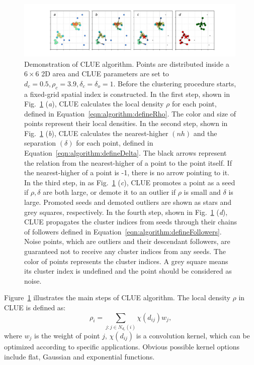 \begin{figure}[ht]
    \centering
    \includegraphics[trim=5cm 0cm 4cm 0cm, clip,width=0.99\textwidth]{chapters/HGCal/figures/clue/Figure2.pdf}
    \caption{Demonstration of CLUE algorithm. Points are distributed inside a $6\times6$ 2D area and CLUE parameters are set to $d_c=0.5,\rho_c=3.9,\delta_c=\delta_o=1$. Before the clustering procedure starts, a fixed-grid spatial index is constructed. In the first step, shown in Fig.~\ref{fig:algorithm:procedure} (\emph{a}), CLUE calculates the local density $\rho$ for each point, defined in Equation~\ref{eqn:algorithm:defineRho}. The color and size of points represent their local densities. In the second step, shown in Fig.~\ref{fig:algorithm:procedure} (\emph{b}), CLUE calculates the nearest-higher $(nh)$ and the separation $(\delta)$ for each point, defined in Equation~\ref{eqn:algorithm:defineDelta}. The black arrows represent the relation from the nearest-higher of a point to the point itself. If the nearest-higher of a point is -1, there is no arrow pointing to it. In the third step, in as Fig.~\ref{fig:algorithm:procedure} (\emph{c}), CLUE promotes a point as a seed if $\rho,\delta$ are both large, or demote it to an outlier if $\rho$ is small and $\delta$ is large. Promoted seeds and demoted outliers are shown as stars and grey squares, respectively. In the fourth step, shown in Fig.~\ref{fig:algorithm:procedure} (\emph{d}), CLUE propagates the cluster indices from seeds through their chains of followers defined in Equation~\ref{eqn:algorithm:defineFollowers}. Noise points, which are outliers and their descendant followers, are guaranteed not to receive any cluster indices from any seeds. The color of points represents the cluster indices. A grey square means its cluster index is undefined and the point should be considered as noise.
    }
    \label{fig:algorithm:procedure}
\end{figure}


Figure~\ref{fig:algorithm:procedure} illustrates the main steps of CLUE algorithm. The local density $\rho$ in CLUE is defined as:
\begin{equation} \label{eqn:algorithm:defineRho}
    \rho_i = \sum_{j: j \in N_{d_c}(i)} \chi(d_{ij}) w_j,
\end{equation}
\noindent where $w_j$ is the weight of point $j$, $\chi(d_{ij})$ is a convolution kernel, which can be optimized according to specific applications. Obvious possible kernel options include flat, Gaussian and exponential functions. 

